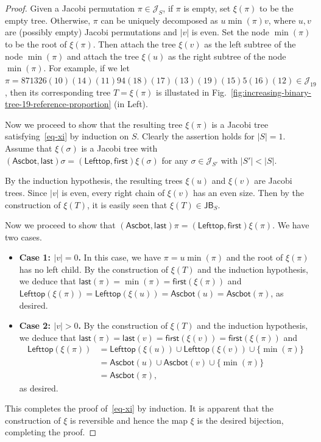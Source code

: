 \documentclass[12pt]{article}
\numberwithin{equation}{section}
\theoremstyle{plain}
\def\Ascbot{\mathsf{Ascbot}}
\def\JB{\mathsf{JB}}
\def\first{\mathsf{first}}
\def\last{\mathsf{last}}
\def\Lefttop{\mathsf{Lefttop}}
\begin{document}
   \begin{proof}
   	Given a Jacobi permutation $\pi\in \mathcal{J}_S$, if   $\pi$ is empty, set $\xi(\pi)$ to be the empty tree.  Otherwise,  $\pi$ can be uniquely decomposed as $u\min(\pi) v$, where $u,v$ are (possibly empty) Jacobi permutations and $|v|$ is even.  Set the node $\min(\pi)$ to be the root of $\xi(\pi)$. Then attach the tree $\xi(v)$ as the left subtree of the node $\min(\pi)$ and attach the tree $\xi(u)$ as  the right subtree of the node $\min(\pi)$.  For example,  if we let $\pi=871326(10)(14)(11)94(18)(17)(13)(19)(15)5(16)(12)
   	\in \mathcal{J}_{19}$, then its corresponding tree $T=\xi(\pi)$ is illustated in Fig.~\ref{fig:increasing-binary-tree-19-reference-proportion} (in Left). 
   	
   	
   	Now we proceed to show that the resulting tree $\xi(\pi)$ is a Jacobi tree satisfying~\eqref{eq-xi} by induction on $S$.  Clearly the assertion holds for $|S|=1$. Assume that $\xi(\sigma)$ is a Jacobi tree with $
   	(\Ascbot, \last)\sigma=(\Lefttop, \first)\xi(\sigma) $ for any $\sigma\in \mathcal{J}_{S'}$ with $|S'|<|S|$. 
   	
   	By the induction hypothesis,  the resulting trees $\xi(u)$ and $\xi(v)$ are  Jacobi trees. Since $|v|$ is even,  every right chain of  $\xi(v)$  has an even size.   Then by the construction of $\xi(T)$, it is easily seen that $\xi(T)\in \JB_S$.  
   	
   	Now we proceed to show that $ 
   	(\Ascbot, \last)\pi=(\Lefttop, \first)\xi(\pi)
   	$. We have two cases.
   	\begin{itemize} 
   	
   	\item {\bf Case 1: $|v|=0$.} In this case,  we have $\pi=u\min(\pi)$ and the root of $\xi(\pi)$ has no left child.  By the construction of $\xi(T)$ and the induction hypothesis, we deduce that
   $\last(\pi)=\min(\pi)=\first(\xi(\pi))$ and $\Lefttop(\xi(\pi))=\Lefttop(\xi(u))=\Ascbot(u)=\Ascbot(\pi)$, as desired.
  \item{\bf Case 2: $|v|>0$.} 
    By the construction of $\xi(T)$ and the induction hypothesis, we deduce that
   $\last(\pi)=\last(v)=\first(\xi(v))=\first(\xi(\pi))$ and 
   \[
   \begin{aligned}
   \Lefttop(\xi(\pi))&=\Lefttop(\xi(u))\cup\Lefttop(\xi(v))\cup\{\min(\pi)\}\\
   &=\Ascbot(u)\cup \Ascbot(v)\cup\{\min(\pi)\}\\
   &=\Ascbot(\pi),
   \end{aligned}
   \] as desired.
   \end{itemize}
    This completes the proof of~\eqref{eq-xi} by induction. It is apparent that the construction of $\xi$ is reversible and hence  the map 
    $\xi$ is the desired   bijection, completing the proof.
   \end{proof}
   
\end{document}

